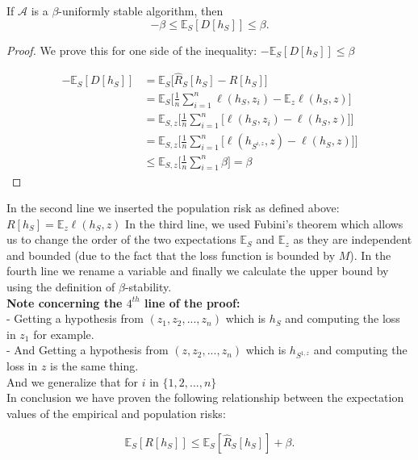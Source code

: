 \documentclass{article}
\begin{document}
\begin{thm}\label{defec_bound}
If $\mathcal{A}$ is a $\beta$-uniformly stable algorithm, then 
\[
	-\beta \le \mathbb{E}_{S}[D[h_S]] \le \beta.
\]
\end{thm}
\begin{proof}
We prove this for one side of the inequality:  
	 $-\mathbb{E}_{S}[D[h_S]] \le \beta$

\begin{align*}
    -\mathbb{E}_S[D[h_S]]
    &=\mathbb{E}_S\Big[
    \hat R_S[h_S]-R[h_S]\Big]\\
    &=\mathbb{E}_S
    \Big[\frac{1}{n}\sum_{i=1}^n \ell(h_S,z_{i})-\mathbb{E}_z\ell(h_S,z)\Big]\\
    &=\mathbb{E}_{S,z}
    \Big[\frac{1}{n}\sum_{i=1}^n \Big[\ell(h_S,z_{i})-\ell(h_S,z)\Big]\Big]\\
    &=\mathbb{E}_{S,z}
    \Big[\frac{1}{n}\sum_{i=1}^n \Big[\ell(h_{S^{i,z}},z)-\ell(h_S,z)\Big]\Big]\\
    &\leq \mathbb{E}_{S,z}
    \Big[\frac{1}{n}\sum_{i=1}^n\beta\Big]=\beta
\end{align*}	 
\end{proof}
In the second line we inserted the population risk as defined  above: $R[h_S]=\mathbb{E}_z\ell(h_S,z)$ In the third line, we used Fubini's theorem which allows us to change the order of the two expectations $\mathbb{E}_{S}$ and $\mathbb{E}_{z}$ as they are independent and bounded (due to the fact that the loss function is bounded by $M$). In the fourth line we rename a variable and finally we calculate the upper bound by using the definition of $\beta$-stability. \\
\textbf{Note concerning the $4^{th}$ line of the proof:} \\ 
- Getting a hypothesis from $(z_1, z_2,..., z_n)$ which is $h_S$ and computing the loss in $z_1$ for example.\\
- And Getting a hypothesis from $(z, z_2,..., z_n)$ which is $h_{S^{1,z}}$ and computing the loss in $z$ is the same thing. \\
And we generalize that for $i$ in $\{1, 2,..., n\}$\\
In conclusion we have proven the following relationship between the expectation values of the empirical and population risks: 
\begin{prop}
\[
	\mathbb{E}_{S}[R[h_{S}]] \le \mathbb{E}_{S}[\hat{R}_{S}[h_S]] + \beta.
\]
\end{prop}
\end{document}
